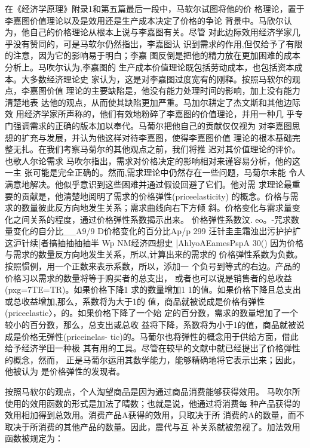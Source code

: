 在《经济学原理》附录1和第五篇最后一段中，马软尔试图将他的价
格理论，置于李嘉图价值理论以及是效用还是生产成本决定了价格的争论
背景中。马欣尔认为，他自己的价格理论从根本上说与李嘉图有关。尽管
对此边际效用经济学家几乎没有赞同的，可是马软尔仍然指出，李嘉图认
识到需求的作用,但仅给予了有限的注意，因为它的影响易于明白；李嘉
图反倒是把他的精力放在更加困难的成本分析上。马吹尔认为,李嘉图的
生产成本价值理论既包括劳动成本，也包括资本成本。大多数经济理论史
家认为，这是对李嘉图过度宽宥的刚释。按照马软尔的观点，李嘉图价值
理论的主要缺陷是，他没有能力处理时间的影响，加上没有能力清楚地表
达他的观点，从而使其缺陷更加严重。马加尔耕定了杰文斯和其他边际效
用经济学家所声称的，他们有效地粉碎了李嘉图的价值理论，并用一种几
乎专门强调需求的正确的版本加以奉代。马葡尔把他自己的贡献仅仅视为
对李嘉图思想的扩充与发展，并认为他这样对待李嘉图，使得李嘉图价值
理论的根本基础完整无扎。在我们考察马菊尔的其他观点之前，我们将推
迟对其价值理论的评价。
也歌人尔论需求
马吹尔指出，需求对价格决定的影响相对来谨容易分析，他的这一主
张可能是完全正确的。然而,需求理论中仍然存在一些问题，马菊尔未能
令人满意地解决。他似乎意识到这些困难并通过假设回避了它们。他对需
求理论最重要的贡献是，他清楚地阅明了需求的价格弹性(priceelasticity)
的概念。价格与需求的数量彼此反方向地发生关系；需求曲线向右下方倾
斜。价格变化与需求量变化之间关系的程度，通过价格弹性系数揭示出来。
价格弹性系数汶.
eo。-咒求数量变化的自分比__A9/9
D价格变化的百分比Ap/p
299
汪针圭圭霜浊出污护护扩这沪针续[者搞抽抽抽抽半
Wp
NM经济四想史
|AhlyoAEamesPspA
30()
因为价格与需求的数量反方向地发生关系，所以,计算出来的需求的
价格弹性系数为负数。按照惯例，用一个正数来表示系数，所以，添加一
个负号到等式的右边。产品的价格习以需求的数量将等于购买者的总支出，
或者也可以说是销售者的总收益(pxg=7TE=TR)。如果价格下降1%
求的数量增加1%
1的值。如果价格下降且总支出或总收益增加,那么，系数将为大于1的
值，商品就被说成是价格有弹性(priceelastic〉，的。如果价格下降了一个始
定的百分数，需求的数量增加了一个较小的百分数，那么，总支出或总收
益将下降，系数将为小于1的值，商品就被说成是价格无弹性(priceinelas-
tic)的。马葡尔也将弹性的概念用于供给方面，借此给予经济学田一种极
其有用的工具。尽管在较早的文献中就已经提出了价格弹性的概念，然而，
正是马葡尔运用其数学能力，能够精确地将它表示出来；因此，他被认为
是价格弹性的发现者。

按照马软尔的观点，个人淘望商品是因为通过商品消费能够获得效用。
马吹尔所使用的效用函数的形式是加法了晴数；也就是说，他通过将消费每
种产品获得的效用相加得到总效用。消费产品A获得的效用，只取决于所
消费的A的数量，而不取决于所消费的其他产品的数量。因此，震代与互
补关系就被忽视了。加法效用函数被规定为：

